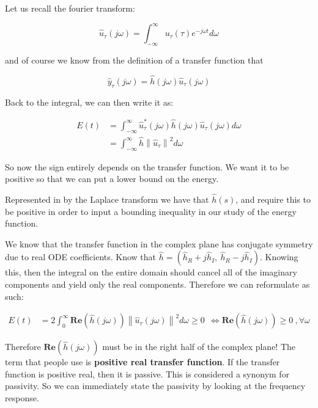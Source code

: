 \documentclass[11pt]{article}
\newcommand{\norm}[1]{\left\lVert#1\right\rVert}
\begin{document}
Let us recall the fourier transform:

\begin{equation}
	\hat{u}_\tau (j\omega) = \int_{-\infty}^\infty u_\tau (\tau) e^{-j\omega t} d\omega
\end{equation}

and of course we know from the definition of a transfer function that 

\begin{equation}
	\hat{y}_\tau (j\omega) = \hat{h} (j\omega) \hat{u}_\tau (j\omega)
\end{equation}

Back to the integral, we can then write it as: 

\begin{align}
	E(t) &= \int_{-\infty}^\infty \hat{u}_\tau^* (j\omega) \hat{h} (j\omega) \hat{u}_\tau (j\omega) d\omega \\
	& = \int_{-\infty}^\infty  \hat{h} \norm{\hat{u}_\tau}^2 d\omega
\end{align}

So now the sign entirely depends on the transfer function. We want it to be positive so that we can put a lower bound on the energy.

Represented in by the Laplace transform we have that $\hat{h}(s)$, and require this to be positive in order to input a bounding inequality in our study of the energy function.

We know that the transfer function in the complex plane has conjugate symmetry due to real ODE coefficients. Know that $\hat{h} = (\hat{h}_R + j\hat{h}_I,\ \hat{h}_R - j\hat{h}_I )$. Knowing this, then the integral on the entire domain should cancel all of the imaginary components and yield only the real components. Therefore we can reformulate as such:
 



\begin{align}
	E(t) & = 2 \int_{0}^\infty  \mathbf{Re} (\hat{h}(j\omega)) \norm{\hat{u}_\tau (j\omega)}^2 d\omega \geq 0 \ \ \iff  \mathbf{Re} (\hat{h}(j\omega)) \geq 0 \ , \forall \omega
\end{align}

Therefore $\mathbf{Re} (\hat{h}(j\omega))$ must be in the right half of the complex plane! The term that people use is \textbf{positive real transfer function}. If the transfer function is positive real, then it is passive. This is considered a synonym for passivity. So we can immediately state the passivity by looking at the frequency response.
\end{document}
